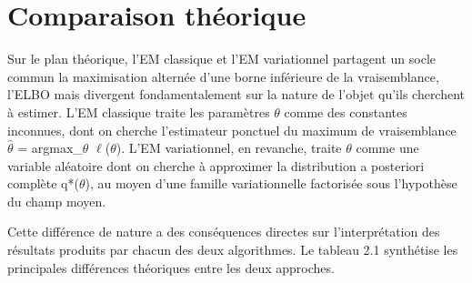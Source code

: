 \section{Comparaison théorique}
Sur le plan théorique, l'EM classique et l'EM variationnel partagent un socle commun  la maximisation alternée d'une borne inférieure de la vraisemblance, l'ELBO  mais divergent fondamentalement sur la nature de l'objet qu'ils cherchent à estimer. L'EM classique traite les paramètres $\theta $ comme des constantes inconnues, dont on cherche l'estimateur ponctuel du maximum de vraisemblance $\hat{\theta }$ = argmax\_$\theta $ $\ell $($\theta $). L'EM variationnel, en revanche, traite $\theta $ comme une variable aléatoire dont on cherche à approximer la distribution a posteriori complète q*($\theta $), au moyen d'une famille variationnelle factorisée sous l'hypothèse du champ moyen.

Cette différence de nature a des conséquences directes sur l'interprétation des résultats produits par chacun des deux algorithmes. Le tableau 2.1 synthétise les principales différences théoriques entre les deux approches.

